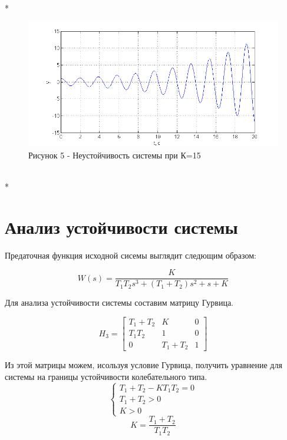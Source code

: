 \documentclass[a4paper, 12pt]{article}
\begin{document}
\hfill\\*
\begin{figure}[h!]
	\centering
	\includegraphics[width = 1\textwidth]{4.png} \\
  \centering Рисунок 5 - Неустойчивость системы при К=15
\end{figure} 
\hfill\\*
\newpage
\section*{ Анализ устойчивости системы}

Предаточная функция исходной сисемы выглядит следющим образом:

\begin{equation}
W(s) = \frac{K}{T_1 T_2 s^3 + (T_1 + T_2)s^2 + s + K}
\end{equation}
\par Для анализа устойчивости системы составим матрицу Гурвица.

\begin{equation}
H_3 = \begin{bmatrix}
T_1 + T_2 &  K & 0 \\
T_1 T_2 & 1 & 0 \\
0 & T_1 + T_2 & 1
\end{bmatrix}
\end{equation}
\par Из этой матрицы можем, исользуя условие Гурвица, получить уравнение для системы на границы устойчивости колебательного типа.
\begin{equation}
\begin{cases}
T_1 + T_2 - K T_1 T_2 = 0 \\
T_1 + T_2 > 0 \\
K > 0
\end{cases}
\end{equation}
\begin{equation}
K =\frac{T_1 + T_2}{T_1T_2}
\end{equation}
\end{document}
